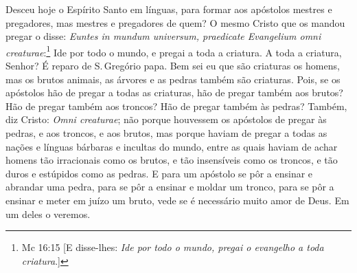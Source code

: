 Desceu hoje o Espírito Santo em línguas, para formar aos apóstolos
mestres e pregadores, mas mestres e pregadores de quem? O mesmo Cristo
que os mandou pregar o disse: \emph{Euntes in mundum universum,
praedicate Evangelium omni creaturae}:\footnote{Mc 16:15 [E disse-lhes: \emph{Ide por todo o mundo, pregai o evangelho a toda criatura}.]} Ide por todo o 
mundo, e pregai a toda a criatura.
A toda a criatura, Senhor? É reparo de S.\,Gregório papa. Bem
sei eu que são criaturas os homens, mas os brutos animais, as árvores e
as pedras também são criaturas. Pois, se os apóstolos hão de pregar a
todas as criaturas, hão de pregar também aos brutos? Hão de pregar
também aos troncos? Hão de pregar também às pedras? Também, diz Cristo:
\emph{Omni creaturae}; não porque houvessem os apóstolos de pregar às
pedras, e aos troncos, e aos brutos, mas porque haviam de pregar a todas
as nações e línguas bárbaras e incultas do mundo, entre as quais haviam
de achar homens tão irracionais como os brutos, e tão insensíveis como
os troncos, e tão duros e estúpidos como as pedras. E para um apóstolo
se pôr a ensinar e abrandar uma pedra, para se pôr a ensinar e moldar um
tronco, para se pôr a ensinar e meter em juízo um bruto, vede se é
necessário muito amor de Deus. Em um deles o veremos.

